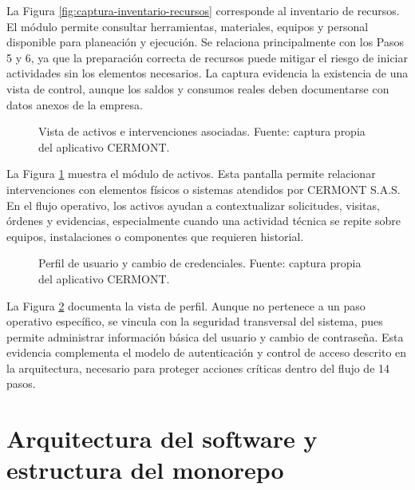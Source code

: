 La Figura \ref{fig:captura-inventario-recursos} corresponde al inventario de recursos. El módulo permite consultar herramientas, materiales, equipos y personal disponible para planeación y ejecución. Se relaciona principalmente con los Pasos 5 y 6, ya que la preparación correcta de recursos puede mitigar el riesgo de iniciar actividades sin los elementos necesarios. La captura evidencia la existencia de una vista de control, aunque los saldos y consumos reales deben documentarse con datos anexos de la empresa.

\begin{figure}[H]
\centering
{}
\caption{Vista de activos e intervenciones asociadas. Fuente: captura propia del aplicativo CERMONT.}
\label{fig:captura-activos}
\end{figure}

La Figura \ref{fig:captura-activos} muestra el módulo de activos. Esta pantalla permite relacionar intervenciones con elementos físicos o sistemas atendidos por CERMONT S.A.S. En el flujo operativo, los activos ayudan a contextualizar solicitudes, visitas, órdenes y evidencias, especialmente cuando una actividad técnica se repite sobre equipos, instalaciones o componentes que requieren historial.

\begin{figure}[H]
\centering
{}
\caption{Perfil de usuario y cambio de credenciales. Fuente: captura propia del aplicativo CERMONT.}
\label{fig:captura-perfil-usuario}
\end{figure}

La Figura \ref{fig:captura-perfil-usuario} documenta la vista de perfil. Aunque no pertenece a un paso operativo específico, se vincula con la seguridad transversal del sistema, pues permite administrar información básica del usuario y cambio de contraseña. Esta evidencia complementa el modelo de autenticación y control de acceso descrito en la arquitectura, necesario para proteger acciones críticas dentro del flujo de 14 pasos.

\section{Arquitectura del software y estructura del monorepo}

